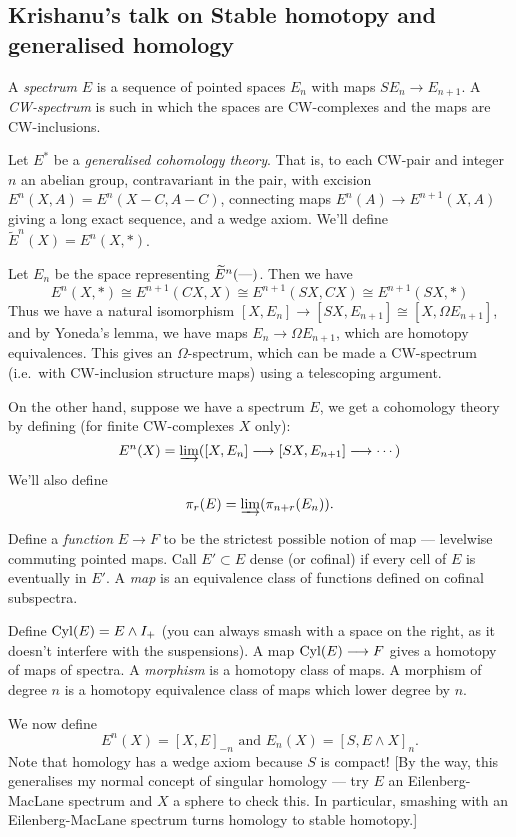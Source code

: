 \documentclass[11pt]{article}
\newcommand{\KanSemResponse}[1]
{
\thispagestyle{fancy}
\section{#1}
}
\begin{document}
\begin{KrishanuAdamsStableHtpy}
\KanSemResponse
{Krishanu's talk on Stable homotopy and generalised homology}
A \emph{spectrum} $E$ is a sequence of pointed spaces $E_n$ with maps $SE_n\to E_{n+1}$. A \emph{CW-spectrum} is such in which the spaces are CW-complexes and the maps are CW-inclusions.

Let $E^*$ be a \emph{generalised cohomology theory}. That is, to each CW-pair and integer $n$ an abelian group, contravariant in the pair, with excision $E^n(X,A)=E^n(X-C,A-C)$, connecting maps $E^n(A)\to E^{n+1}(X,A)$ giving a long exact sequence, and a wedge axiom.
We'll define $\widetilde E^n(X)=E^n(X,\ast)$.

Let $E_n$ be the space representing $\widetilde E^n(\DASH)$. Then we have
\[E^n(X,\ast)\cong E^{n+1}(CX,X)\cong E^{n+1}(SX,CX)\cong E^{n+1}(SX,\ast)\]
Thus we have a natural isomorphism $[X,E_n]\to[SX,E_{n+1}]\cong [X,\Omega E_{n+1}]$, and by Yoneda's lemma, we have maps $E_n\to\Omega E_{n+1}$, which are homotopy equivalences. This gives an $\Omega$-spectrum, which can be made a CW-spectrum (i.e.\ with CW-inclusion structure maps) using a telescoping argument.

On the other hand, suppose we have a spectrum $E$, we get a cohomology theory by defining (for finite CW-complexes $X$ only):
\[E^n(X)=\varinjlim([X,E_n] \to[SX,E_{n+1}]\to\cdots)\]
We'll also define
\[\pi_r(E)=\varinjlim(\pi_{n+r}(E_n)).\]

Define a \emph{function} $E\to F$ to be the strictest possible notion of map --- levelwise commuting pointed maps. Call $E'\subset E$ dense (or cofinal) if every cell of $E$ is eventually in $E'$. A \emph{map} is an equivalence class of functions defined on cofinal subspectra.

Define $\Cyl(E)=E\wedge I_+$ (you can always smash with a space on the right, as it doesn't interfere with the suspensions). A map $\Cyl(E)\to F$ gives a homotopy of maps of spectra. A \emph{morphism} is a homotopy class of maps. A morphism of degree $n$ is a homotopy equivalence class of maps which lower degree by $n$.

We now define
\[E^n(X)=[X,E]_{-n}\text{ \ and \ }E_n(X)=[S,E\wedge X]_n.\]
Note that homology has a wedge axiom because $S$ is compact!
[By the way, this generalises my normal concept of singular homology --- try $E$ an Eilenberg-MacLane spectrum and $X$ a sphere to check this. In particular, smashing with an Eilenberg-MacLane spectrum turns homology to stable homotopy.]


\end{KrishanuAdamsStableHtpy}
\end{document}
